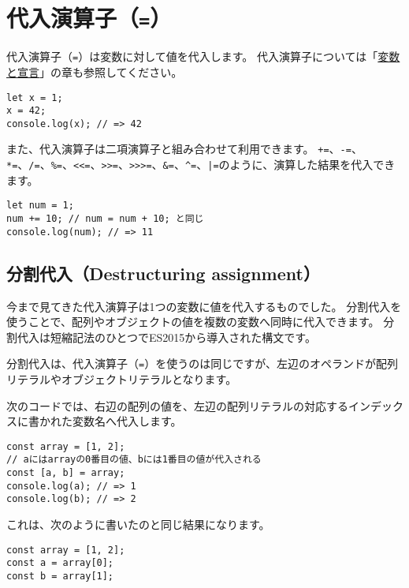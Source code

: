 \hypertarget{assignment-operator}{%
\section{\texorpdfstring{代入演算子（\texttt{=}）}{代入演算子（=）}}\label{assignment-operator}}

代入演算子（\texttt{=}）は変数に対して値を代入します。
代入演算子については「\hyperlink{variable-and-declaration}{変数と宣言}」の章も参照してください。

\begin{lstlisting}
let x = 1;
x = 42;
console.log(x); // => 42
\end{lstlisting}

また、代入演算子は二項演算子と組み合わせて利用できます。
\lstinline{+=}、\lstinline{-=}、\lstinline{*=}、\lstinline{/=}、\lstinline{%=}、\lstinline{<<=}、\lstinline{>>=}、\lstinline{>>>=}、\lstinline{&=}、\lstinline{^=}、\lstinline{|=}のように、演算した結果を代入できます。

\begin{lstlisting}
let num = 1;
num += 10; // num = num + 10; と同じ
console.log(num); // => 11
\end{lstlisting}

\hypertarget{destructuring-assignment}{%
\subsection{分割代入（Destructuring
assignment）\protect{}}\label{destructuring-assignment}}

今まで見てきた代入演算子は1つの変数に値を代入するものでした。
分割代入を使うことで、配列やオブジェクトの値を複数の変数へ同時に代入できます。
分割代入は短縮記法のひとつでES2015から導入された構文です。

分割代入は、代入演算子（\texttt{=}）を使うのは同じですが、左辺のオペランドが配列リテラルやオブジェクトリテラルとなります。

次のコードでは、右辺の配列の値を、左辺の配列リテラルの対応するインデックスに書かれた変数名へ代入します。

\begin{lstlisting}
const array = [1, 2];
// aにはarrayの0番目の値、bには1番目の値が代入される
const [a, b] = array;
console.log(a); // => 1
console.log(b); // => 2
\end{lstlisting}

これは、次のように書いたのと同じ結果になります。

\begin{lstlisting}
const array = [1, 2];
const a = array[0];
const b = array[1];
\end{lstlisting}

